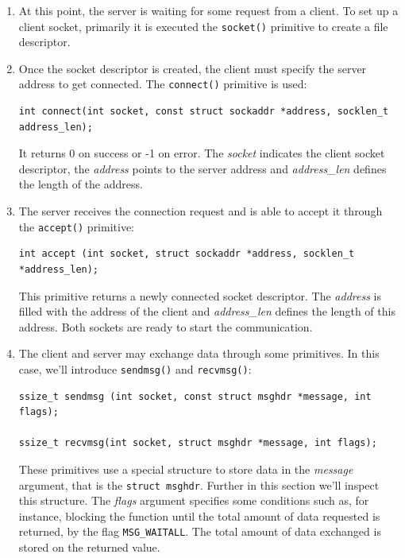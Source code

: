 \begin{enumerate}
\item At this point, the server is waiting for some request from a client. To set up a client socket, primarily it is executed the \texttt{socket()} primitive to create a file descriptor.

\item Once the socket descriptor is created, the client must specify the server address to get connected. The \texttt{connect()} primitive is used:

\begin{lstlisting}[caption=Declaration of the \texttt{connect()} function]
int connect(int socket, const struct sockaddr *address, socklen_t address_len);
\end{lstlisting}

It returns 0 on success or -1 on error. The \textit{socket} indicates the client socket descriptor, the \textit{address} points to the server address and \textit{address\_len} defines the length of the address.

\item The server receives the connection request and is able to accept it through the \texttt{accept()} primitive:

\begin{lstlisting}[caption=Declaration of the \texttt{accept()} function]
int accept (int socket, struct sockaddr *address, socklen_t *address_len);
\end{lstlisting}

This primitive returns a newly connected socket descriptor. The \textit{address} is filled with the address of the client and \textit{address\_len} defines the length of this address. Both sockets are ready to start the communication.

\item The client and server may exchange data through some primitives. In this case, we'll introduce \texttt{sendmsg()} and \texttt{recvmsg()}:

\begin{lstlisting}[caption=Declaration of the \texttt{sendmsg()} and \texttt{recvmsg()} function]
ssize_t sendmsg (int socket, const struct msghdr *message, int flags);

ssize_t recvmsg(int socket, struct msghdr *message, int flags);
\end{lstlisting}

These primitives use a special structure to store data in the \textit{message} argument, that is the \texttt{struct msghdr}. Further in this section we'll inspect this structure. The \textit{flags} argument specifies some conditions such as, for instance, blocking the function until the total amount of data requested is returned, by the flag \texttt{MSG\_WAITALL}. The total amount of data exchanged is stored on the returned value.


\end{enumerate}
